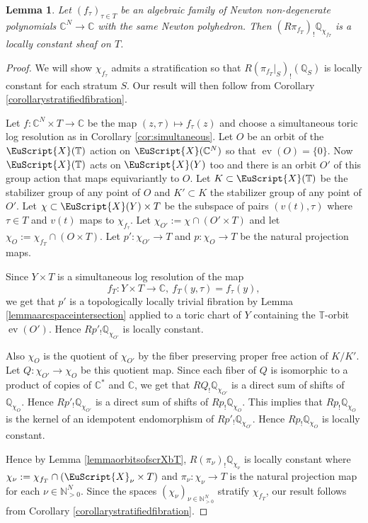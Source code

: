 \documentclass[11pt]{amsart}
\newtheorem{lemma}[thm]{Lemma}
\newcommand{\scrX}{\EuScript{X}}
\newcommand{\bQ}{\mathbb{Q}}
\newcommand{\bC}{\mathbb{C}}
\newcommand{\bN}{\mathbb{N}}
\numberwithin{equation}{section}
\newcommand{\C}{\mathbb C}
\newcommand{\bT}{\mathbb{T}}
\newcommand{\ev}{\operatorname{ev}}
\begin{document}
\begin{lemma} \label{lemmaTopTrivual}
	Let $(f_\tau)_{\tau\in T}$ be an algebraic family of Newton non-degenerate polynomials $\C^N \to \C$ with the same Newton polyhedron. Then $(R\pi_{f_T})_!\bQ_{\chi_{f_T}}$ is a locally constant sheaf on $T$.
\end{lemma}
\begin{proof}
	We will show $\chi_{f_\tau}$ admits a stratification so that $R(\pi_{f_T}|_S)_!(\bQ_S)$ is locally constant for each stratum $S$. Our result will then follow from Corollary \ref{corollarystratifiedfibration}.


	Let $f: \bC^N \times T \to \bC$ be the map $(z,\tau) \mapsto f_\tau(z)$ and choose a simultaneous toric log resolution as in Corollary \ref{cor:simultaneous}.
	Let $O$ be an orbit of the $\scrX(\bT)$ action on $\scrX(\bC^N)$ so that $\ev(O) = \{0\}$.
	Now $\scrX(\bT)$ acts on $\scrX(Y)$ too and there is an orbit $O'$ of this group action that maps equivariantly to $O$.
	Let $K \subset \scrX(\bT)$ be the stabilizer group of any point of $O$ and $K' \subset K$ the stabilizer group of any point of $O'$.
	Let $\chi \subset \scrX(Y) \times T$ be the subspace of pairs $(v(t),\tau)$ where $\tau \in T$ and $v(t)$ maps to $\chi_{f_\tau}$.
	Let $\chi_{O'} := \chi \cap (O' \times T)$
	and let $\chi_O := \chi_{f_T} \cap (O \times T)$.
	Let $p' : \chi_{O'} \to T$ and $p : \chi_O \to T$ be the natural projection maps.

	Since $Y \times T$ is a simultaneous log resolution of the map
	\begin{equation}
		f_T : Y \times T \to \bC, \ f_T(y,\tau) = f_\tau(y),
	\end{equation}
	we get that $p'$ is a topologically locally trivial fibration by Lemma \ref{lemmaarcspaceintersection} applied to a toric chart of $Y$ containing the $\bT$-orbit $\ev(O')$.
	Hence $Rp'_!\bQ_{\chi_{O'}}$ is locally constant.

	Also $\chi_O$ is the quotient of $\chi_{O'}$ by the fiber preserving proper free action of $K/K'$.
	Let $Q : \chi_{O'} \to \chi_O$ be this quotient map.
	Since each fiber of $Q$ is isomorphic to a product of copies of $\bC^*$ and $\bC$, we get that $RQ_!\bQ_{\chi_{O'}}$ is a direct sum of shifts of $\bQ_{\chi_O}$.
	Hence $Rp'_!\bQ_{\chi_{O'}}$
	is a direct sum of shifts of $Rp_!\bQ_{\chi_O}$.
	This implies that $Rp_!\bQ_{\chi_O}$ is the kernel of an idempotent endomorphism of $Rp'_!\bQ_{\chi_{O'}}$.
	Hence $Rp_!\bQ_{\chi_O}$ is locally constant.



	Hence by Lemma \ref{lemmaorbitsofscrXbT},
	$R(\pi_\nu)_! \bQ_{\chi_\nu}$ is locally constant where
	$\chi_\nu := \chi_{f_T} \cap (\scrX_\nu \times T)$ and
	$\pi_\nu : \chi_\nu \to T$ is the natural projection map for each $\nu \in \bN^N_{>0}$.
	Since the spaces $(\chi_\nu)_{\nu \in \bN^N_{>0}}$ stratify $\chi_{f_T}$, our result follows from Corollary \ref{corollarystratifiedfibration}.
\end{proof}
\end{document}
